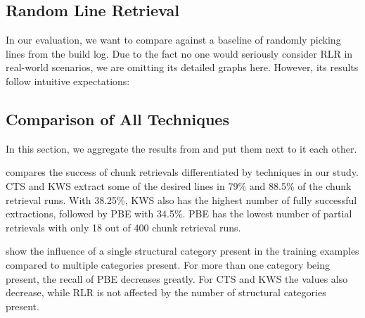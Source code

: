 \subsection{Random Line Retrieval}
\label{sec:r:rlr}

In our evaluation, we want to compare against a baseline of randomly
picking lines from the build log. Due to the fact no one would
seriously consider RLR in real-world scenarios, we are omitting its
detailed graphs here. However, its results follow intuitive
expectations:

\subsection{Comparison of All Techniques}
In this section, we aggregate the results from
 and put them next to it
each other.

 compares the success of chunk
retrievals differentiated by techniques in our study. CTS and KWS
extract some of the desired lines in 79\% and 88.5\% of the chunk
retrieval runs. With 38.25\%, KWS also has the highest number of fully
successful extractions, followed by PBE with 34.5\%. PBE has the
lowest number of partial retrievals with only 18 out of 400 chunk
retrieval runs.


show the influence of a single structural category present in the
training examples compared to multiple categories present. For more
than one category being present, the recall of PBE decreases greatly.
For CTS and KWS the values also decrease, while RLR is not affected by
the number of structural categories present.

